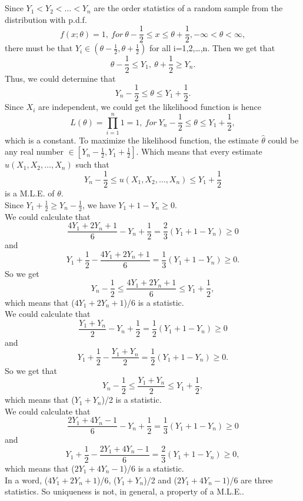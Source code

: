 \documentclass[10.5pt]{article}
\begin{document}
\section{}
Since $Y_1<Y_2<\dots<Y_n$ are the order statistics of a random sample from the distribution with p.d.f. $$f(x;\theta)=1,~for ~\theta-\frac{1}{2}\leqslant x\leqslant\theta+\frac{1}{2},-\infty<\theta<\infty,$$\indent
there must be that $Y_i\in(\theta-\frac{1}{2},\theta+\frac{1}{2})$ for all i=1,2,\dots,n. Then we get that $$\theta-\frac{1}{2}\leqslant Y_1,~\theta+\frac{1}{2}\geqslant Y_n.$$\indent
Thus, we could determine that $$Y_n-\frac{1}{2}\leqslant \theta\leqslant Y_1+\frac{1}{2}.$$\indent
Since $X_i$ are independent, we could get the likelihood function is hence $$L(\theta)=\prod_{i=1}^n1=1,~for ~Y_n-\frac{1}{2}\leqslant \theta\leqslant Y_1+\frac{1}{2},$$\indent
which is a constant. To maximize the likelihood function, the estimate $\hat{\theta}$ could be any real number $\in[Y_n-\frac{1}{2},Y_1+\frac{1}{2}]$. Which means that every estimate $u(X_1,X_2,\dots,X_n)$ such that $$Y_n-\frac{1}{2}\leqslant u(X_1,X_2,\dots,X_n)\leqslant Y_1+\frac{1}{2}$$\indent
is a M.L.E. of $\theta$.\\\indent
Since $Y_1+\frac{1}{2}\geqslant Y_n-\frac{1}{2}$, we have $Y_1+1-Y_n\geqslant 0$.\\\indent
We could calculate that $$\frac{4Y_1+2Y_n+1}{6}-Y_n+\frac{1}{2}=\frac{2}{3}(Y_1+1-Y_n)\geqslant 0$$\indent
and $$Y_1+\frac{1}{2}-\frac{4Y_1+2Y_n+1}{6}=\frac{1}{3}(Y_1+1-Y_n)\geqslant 0.$$\indent
So we get $$Y_n-\frac{1}{2}\leqslant \frac{4Y_1+2Y_n+1}{6}\leqslant Y_1+\frac{1}{2},$$\indent
which means that ($4Y_1+2Y_n+1$)/6 is a statistic.\\\indent
We could calculate that $$\frac{Y_1+Y_n}{2}-Y_n+\frac{1}{2}=\frac{1}{2}(Y_1+1-Y_n)\geqslant 0$$\indent
and $$Y_1+\frac{1}{2}-\frac{Y_1+Y_n}{2}=\frac{1}{2}(Y_1+1-Y_n)\geqslant 0.$$\indent
So we get that $$Y_n-\frac{1}{2}\leqslant \frac{Y_1+Y_n}{2}\leqslant Y_1+\frac{1}{2},$$\indent
which means that ($Y_1+Y_n$)/2 is a statistic.\\\indent
We could calculate that $$\frac{2Y_1+4Y_n-1}{6}-Y_n+\frac{1}{2}=\frac{1}{3}(Y_1+1-Y_n)\geqslant 0$$\indent
and $$Y_1+\frac{1}{2}-\frac{2Y_1+4Y_n-1}{6}=\frac{2}{3}(Y_1+1-Y_n)\geqslant 0,$$\indent
which means that ($2Y_1+4Y_n-1$)/6 is a statistic.\\\indent
In a word, ($4Y_1+2Y_n+1$)/6, ($Y_1+Y_n$)/2 and ($2Y_1+4Y_n-1$)/6 are three statistics. So uniqueness is not, in general, a property of a M.L.E..
\end{document}
